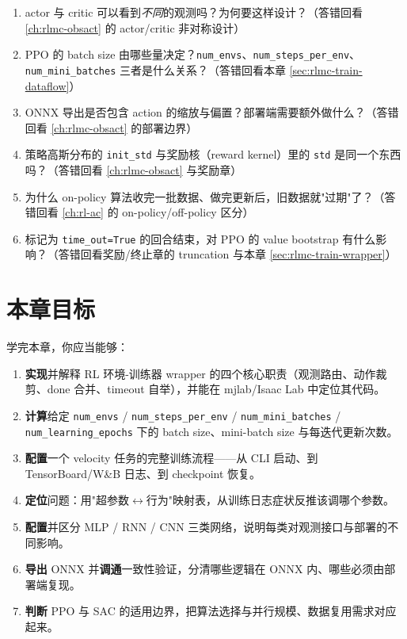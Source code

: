 \begin{practice}
\begin{enumerate}
  \item actor 与 critic 可以看到\emph{不同}的观测吗？为何要这样设计？（答错回看 \cref{ch:rlmc-obsact} 的 actor/critic 非对称设计）
  \item PPO 的 batch size 由哪些量决定？\verb|num_envs|、\verb|num_steps_per_env|、\verb|num_mini_batches| 三者是什么关系？（答错回看本章 \cref{sec:rlmc-train-dataflow}）
  \item ONNX 导出是否包含 action 的缩放与偏置？部署端需要额外做什么？（答错回看 \cref{ch:rlmc-obsact} 的部署边界）
  \item 策略高斯分布的 \verb|init_std| 与奖励核（reward kernel）里的 \verb|std| 是同一个东西吗？（答错回看 \cref{ch:rlmc-obsact} 与奖励章）
  \item 为什么 on-policy 算法收完一批数据、做完更新后，旧数据就"过期"了？（答错回看 \cref{ch:rl-ac} 的 on-policy/off-policy 区分）
  \item 标记为 \verb|time_out=True| 的回合结束，对 PPO 的 value bootstrap 有什么影响？（答错回看奖励/终止章的 truncation 与本章 \cref{sec:rlmc-train-wrapper}）
\end{enumerate}
\end{practice}

\section*{本章目标}
\label{sec:rlmc-train-goals}

学完本章，你应当能够：

\begin{enumerate}
  \item \textbf{实现}并解释 RL 环境-训练器 wrapper 的四个核心职责（观测路由、动作裁剪、done 合并、timeout 自举），并能在 mjlab/Isaac Lab 中定位其代码。
  \item \textbf{计算}给定 \verb|num_envs| / \verb|num_steps_per_env| / \verb|num_mini_batches| / \verb|num_learning_epochs| 下的 batch size、mini-batch size 与每迭代更新次数。
  \item \textbf{配置}一个 velocity 任务的完整训练流程——从 CLI 启动、到 TensorBoard/W\&B 日志、到 checkpoint 恢复。
  \item \textbf{定位}问题：用"超参数$\leftrightarrow$行为"映射表，从训练日志症状反推该调哪个参数。
  \item \textbf{配置}并区分 MLP / RNN / CNN 三类网络，说明每类对观测接口与部署的不同影响。
  \item \textbf{导出} ONNX 并\textbf{调通}一致性验证，分清哪些逻辑在 ONNX 内、哪些必须由部署端复现。
  \item \textbf{判断} PPO 与 SAC 的适用边界，把算法选择与并行规模、数据复用需求对应起来。
\end{enumerate}

